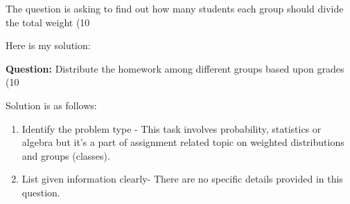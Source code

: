 \documentclass[12pt]{article}
\begin{document}
\begin {center}
The question is asking to find out how many students each group should divide the total weight (10%

Here is my solution:

\textbf{Question:} Distribute the homework among different groups based upon grades (10%

Solution is as follows:
\begin{enumerate}
    \item Identify the problem type - This task involves probability, statistics or algebra but it's a part of assignment related topic on weighted distributions and groups (classes).  
    
    \item List given information clearly- There are no specific details provided in this question. 
     

\end{enumerate}
\end{center}
\end{document}

